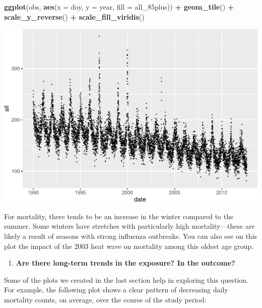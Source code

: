 \documentclass[
]{book}
\newenvironment{Shaded}{\begin{snugshade}}{\end{snugshade}}
\newcommand{\DataTypeTok}[1]{\textcolor[rgb]{0.13,0.29,0.53}{#1}}
\newcommand{\KeywordTok}[1]{\textcolor[rgb]{0.13,0.29,0.53}{\textbf{#1}}}
\newcommand{\NormalTok}[1]{#1}
\newcommand{\OperatorTok}[1]{\textcolor[rgb]{0.81,0.36,0.00}{\textbf{#1}}}
\newcommand{\StringTok}[1]{\textcolor[rgb]{0.31,0.60,0.02}{#1}}
\providecommand{\tightlist}{%
  \setlength{\itemsep}{0pt}\setlength{\parskip}{0pt}}
\begin{document}
\begin{Shaded}
\begin{Highlighting}[]
\KeywordTok{ggplot}\NormalTok{(obs, }\KeywordTok{aes}\NormalTok{(}\DataTypeTok{x =}\NormalTok{ doy, }\DataTypeTok{y =}\NormalTok{ year, }\DataTypeTok{fill =}\NormalTok{ all_85plus)) }\OperatorTok{+}\StringTok{ }
\StringTok{  }\KeywordTok{geom_tile}\NormalTok{() }\OperatorTok{+}
\StringTok{  }\KeywordTok{scale_y_reverse}\NormalTok{() }\OperatorTok{+}\StringTok{ }
\StringTok{  }\KeywordTok{scale_fill_viridis}\NormalTok{()}
\end{Highlighting}
\end{Shaded}

\includegraphics{adv_epi_analysis_files/figure-latex/unnamed-chunk-11-1.pdf}

For mortality, there tends to be an increase in the winter compared to the summer.
Some winters have stretches with particularly high mortality---these are likely
a result of seasons with strong influenza outbreaks. You can also see on this
plot the impact of the 2003 heat wave on mortality among this oldest age group.

\begin{enumerate}
\def\labelenumi{\arabic{enumi}.}
\setcounter{enumi}{3}
\tightlist
\item
  \textbf{Are there long-term trends in the exposure? In the outcome?}
\end{enumerate}

Some of the plots we created in the last section help in exploring this
question. For example, the following plot shows a clear pattern of decreasing
daily mortality counts, on average, over the course of the study period:
\end{document}
